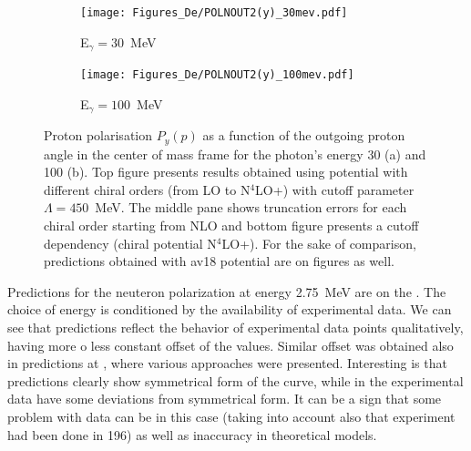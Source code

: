     \begin{figure}[h]
        \centering
        \begin{subfigure}[b]{0.46\textwidth}
            \texttt{[image: Figures\_De/POLNOUT2(y)\_30mev.pdf]}
            \caption{\small E$_\gamma = 30$~MeV}
            \label{PY_30_vert}
        \end{subfigure}
        \begin{subfigure}[b]{0.46\textwidth}
            \texttt{[image: Figures\_De/POLNOUT2(y)\_100mev.pdf]}
            \caption{\small E$_\gamma = 100$~MeV}
            \label{PY_100_vert}
        \end{subfigure}
        \caption{Proton polarisation $P_y(p)$ 
        \label{PY_30_100_vert}
        as a function of the outgoing proton angle in the center of mass frame 
        for the photon's energy \SI{30}{\mev} (a) and \SI{100}{\mev} (b).
        Top figure presents results obtained using potential
        with different chiral orders (from LO to N$^4$LO+) with cutoff parameter $\Lambda=450$~MeV.
        The middle pane shows truncation errors for each 
        chiral order starting from NLO and
        bottom figure presents a cutoff dependency (chiral potential N$^4$LO+).
        For the sake of comparison, predictions obtained with \gls*{av18} potential are on  figures as well.}
    \end{figure}


    Predictions for the neuteron polarization at energy 2.75~MeV are on the
    . The choice of energy is conditioned by the availability of experimental data.
    We can see that predictions reflect the behavior of experimental data points qualitatively,
    having more o less constant offset of the values. Similar offset was obtained
    also in predictions at \cite{ArenhovelPhotodisint1991}, where various approaches were presented.
    Interesting is that predictions clearly show symmetrical form of the curve, while in the experimental data
    have some deviations from symmetrical form. It can be a sign that some problem with data can be
    in this case (taking into account also that experiment had been done in 196) as well 
    as inaccuracy in theoretical models.

